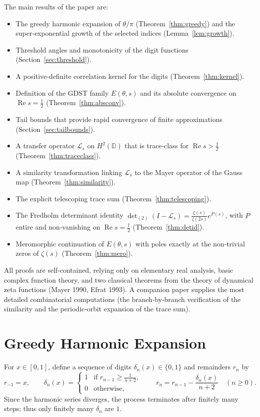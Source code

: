 \documentclass[12pt,a4paper]{article}
\theoremstyle{remark}
\begin{document}
The main results of the paper are:
\begin{itemize}
\item The greedy harmonic expansion of $\theta/\pi$ (Theorem~\ref{thm:greedy}) and the super‑exponential growth of the selected indices (Lemma~\ref{lem:growth}).
\item Threshold angles and monotonicity of the digit functions (Section~\ref{sec:threshold}).
\item A positive‑definite correlation kernel for the digits (Theorem~\ref{thm:kernel}).
\item Definition of the GDST family $E(\theta,s)$ and its absolute convergence on $\operatorname{Re}s=\frac12$ (Theorem~\ref{thm:absconv}).
\item Tail bounds that provide rapid convergence of finite approximations (Section~\ref{sec:tailbounds}).
\item A transfer operator $\mathcal{L}_s$ on $H^2(\mathbb{D})$ that is trace‑class for $\operatorname{Re}s>\frac12$ (Theorem~\ref{thm:traceclass}).
\item A similarity transformation linking $\mathcal{L}_s$ to the Mayer operator of the Gauss map (Theorem~\ref{thm:similarity}).
\item The explicit telescoping trace sum (Theorem~\ref{thm:telescoping}).
\item The Fredholm determinant identity
$\det_{(2)}(I-\mathcal{L}_s)=\frac{\zeta(s)}{\zeta(2s)}e^{P(s)}$,
with $P$ entire and non‑vanishing on $\operatorname{Re}s=\frac12$ (Theorem~\ref{thm:detid}).
\item Meromorphic continuation of $E(\theta,s)$ with poles exactly at the non‑trivial zeros of $\zeta(s)$ (Theorem~\ref{thm:mero}).
\end{itemize}

All proofs are self‑contained, relying only on elementary real analysis, basic complex function theory, and two classical theorems from the theory of dynamical zeta functions (Mayer 1990, Efrat 1993).  A companion paper \cite{Geere2026} supplies the most detailed combinatorial computations (the branch‑by‑branch verification of the similarity and the periodic‑orbit expansion of the trace sum).

\section{Greedy Harmonic Expansion}
\label{sec:greedy}

For $x\in[0,1]$, define a sequence of digits $\delta_n(x)\in\{0,1\}$ and remainders $r_n$ by
\begin{equation}\label{eq:algo}
r_{-1}=x,\qquad
\delta_n(x)=\begin{cases}
1 &\text{if } r_{n-1}\ge \frac1{n+2},\\[2pt]
0 &\text{otherwise},
\end{cases}
\qquad
r_n = r_{n-1}-\frac{\delta_n(x)}{n+2}\quad (n\ge 0).
\end{equation}
Since the harmonic series diverges, the process terminates after finitely many steps; thus only finitely many $\delta_n$ are $1$.
\end{document}
